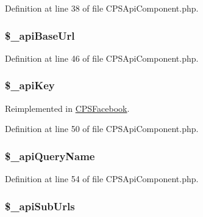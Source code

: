 Definition at line 38 of file CPSApiComponent.php.

\hypertarget{classCPSApiComponent_a2a3098653897c46b33497dd90b807f64}{
\subsubsection[{\$\_\-apiBaseUrl}]{\setlength{\rightskip}{0pt plus 5cm}\$\_\-apiBaseUrl}}
\label{classCPSApiComponent_a2a3098653897c46b33497dd90b807f64}


Definition at line 46 of file CPSApiComponent.php.

\hypertarget{classCPSApiComponent_a30d859488ed1921f08a7e8191363d9a4}{
\subsubsection[{\$\_\-apiKey}]{\setlength{\rightskip}{0pt plus 5cm}\$\_\-apiKey}}
\label{classCPSApiComponent_a30d859488ed1921f08a7e8191363d9a4}


Reimplemented in \hyperlink{classCPSFacebook_a30d859488ed1921f08a7e8191363d9a4}{CPSFacebook}.



Definition at line 50 of file CPSApiComponent.php.

\hypertarget{classCPSApiComponent_adb92b727d9e245493a2001eca37693de}{
\subsubsection[{\$\_\-apiQueryName}]{\setlength{\rightskip}{0pt plus 5cm}\$\_\-apiQueryName}}
\label{classCPSApiComponent_adb92b727d9e245493a2001eca37693de}


Definition at line 54 of file CPSApiComponent.php.

\hypertarget{classCPSApiComponent_aee5e6cb1a983f0bd5f57cefdd5a97241}{
\subsubsection[{\$\_\-apiSubUrls}]{\setlength{\rightskip}{0pt plus 5cm}\$\_\-apiSubUrls}}
\label{classCPSApiComponent_aee5e6cb1a983f0bd5f57cefdd5a97241}


